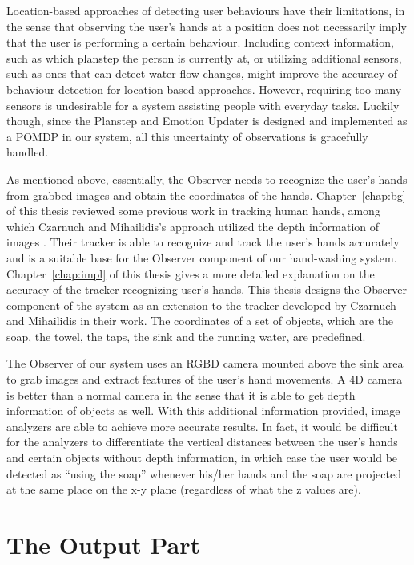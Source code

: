 Location-based approaches of detecting user behaviours have their limitations, in the sense that observing the user's hands at a position does not necessarily imply that the user is performing a certain behaviour. Including context information, such as which planstep the person is currently at, or utilizing additional sensors, such as ones that can detect water flow changes, might improve the accuracy of behaviour detection for location-based approaches. However, requiring too many sensors is undesirable for a system assisting people with everyday tasks. Luckily though, since the Planstep and Emotion Updater is designed and implemented as a POMDP in our system, all this uncertainty of observations is gracefully handled.

As mentioned above, essentially, the Observer needs to recognize the user's hands from grabbed images and obtain the coordinates of the hands. Chapter~\ref{chap:bg} of this thesis reviewed some previous work in tracking human hands, among which Czarnuch and Mihailidis's approach utilized the depth information of images \cite{czarnuch2014}. Their tracker is able to recognize and track the user's hands accurately and is a suitable base for the Observer component of our hand-washing system. Chapter~\ref{chap:impl} of this thesis gives a more detailed explanation on the accuracy of the tracker recognizing user's hands. This thesis designs the Observer component of the system as an extension to the tracker developed by Czarnuch and Mihailidis in their work. The coordinates of a set of objects, which are the soap, the towel, the taps, the sink and the running water, are predefined. 

The Observer of our system uses an RGBD camera mounted above the sink area to grab images and extract features of the user's hand movements. A 4D camera is better than a normal camera in the sense that it is able to get depth information of objects as well. With this additional information provided, image analyzers are able to achieve more accurate results. In fact, it would be difficult for the analyzers to differentiate the vertical distances between the user's hands and certain objects without depth information, in which case the user would be detected as ``using the soap'' whenever his/her hands and the soap are projected at the same place on the x-y plane (regardless of what the z values are). 

\section{The Output Part}
\label{sec:design-output}

